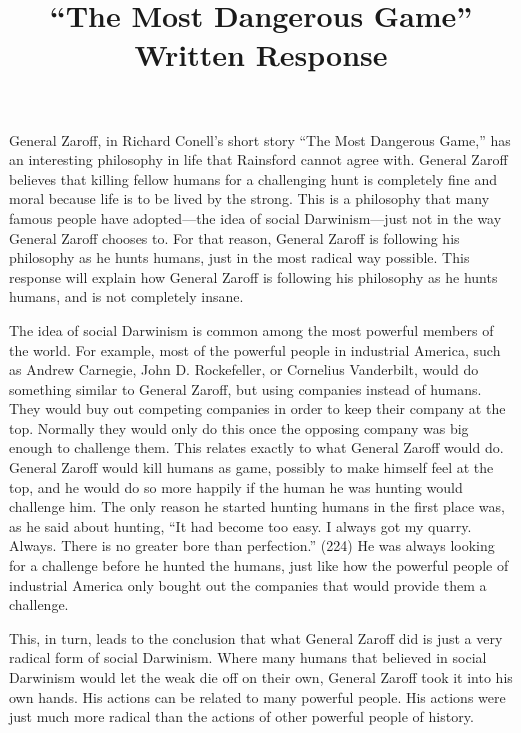 \documentclass[12pt,letterpaper]{article}
\title{``The Most Dangerous Game'' Written Response}
\begin{document}
  
  General Zaroff, in Richard Conell's short story ``The Most Dangerous Game,'' has an interesting philosophy in life that Rainsford cannot agree with.  General Zaroff believes that killing fellow humans for a challenging hunt is completely fine and moral because life is to be lived by the strong.  This is a philosophy that many famous people have adopted---the idea of social Darwinism---just not in the way General Zaroff chooses to.  For that reason, General Zaroff is following his philosophy as he hunts humans, just in the most radical way possible.  This response will explain how General Zaroff is following his philosophy as he hunts humans, and is not completely insane.
  
  The idea of social Darwinism is common among the most powerful members of the world.  For example, most of the powerful people in industrial America, such as Andrew Carnegie, John D. Rockefeller, or Cornelius Vanderbilt, would do something similar to General Zaroff, but using companies instead of humans.  They would buy out competing companies in order to keep their company at the top.  Normally they would only do this once the opposing company was big enough to challenge them.  This relates exactly to what General Zaroff would do.  General Zaroff would kill humans as game, possibly to make himself feel at the top, and he would do so more happily if the human he was hunting would challenge him.  The only reason he started hunting humans in the first place was, as he said about hunting, ``It had become too easy.  I always got my quarry.  Always.  There is no greater bore than perfection.'' (224)  He was always looking for a challenge before he hunted the humans, just like how the powerful people of industrial America only bought out the companies that would provide them a challenge.

  This, in turn, leads to the conclusion that what General Zaroff did is just a very radical form of social Darwinism.  Where many humans that believed in social Darwinism would let the weak die off on their own, General Zaroff took it into his own hands.  His actions can be related to many powerful people.  His actions were just much more radical than the actions of other powerful people of history.
\end{document}

